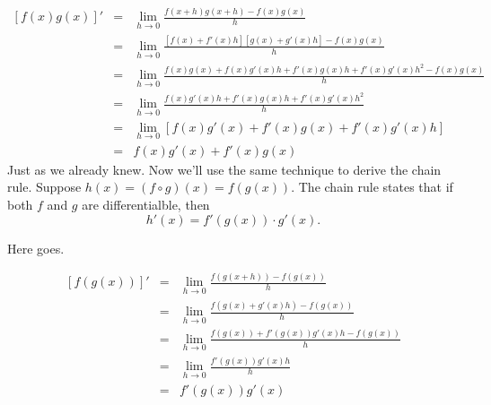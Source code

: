 \documentclass[12pt,addpoints, answers, fleqn]{exam}
\begin{document}
\begin{eqnarray*}
\left[ f \left( x \right)  g \left( x \right) \right]' &=&
\mathop {\lim }\limits_{h \to 0 }  
\frac{f \left( x+h \right)  g \left( x+h \right) - f \left( x \right)  g \left( x \right) }{h}\\
&=&
\mathop {\lim }\limits_{h \to 0 }  
\frac{\left[  f \left( x  \right) + f' \left( x  \right) h \right]  \left[  g \left( x  \right) + g' \left( x  \right) h \right] - f \left( x \right)  g \left( x \right) }{h}\\
&=&
\mathop {\lim }\limits_{h \to 0 }  
\frac{f \left( x \right)  g \left( x \right) + f \left( x  \right)  g' \left( x  \right) h + f' \left( x  \right)      g \left( x  \right)h + f' \left( x  \right)    g' \left( x  \right) h^2  - f \left( x \right)  g \left( x \right) }{h}\\
&=&
\mathop {\lim }\limits_{h \to 0 }  
\frac{f \left( x  \right)  g' \left( x  \right) h + f' \left( x  \right)      g \left( x  \right)h + f' \left( x  \right)    g' \left( x  \right) h^2 }{h}\\
&=&
\mathop {\lim }\limits_{h \to 0 }  
\left[ f \left( x  \right)  g' \left( x  \right)  + f' \left( x  \right)      g \left( x  \right) + f' \left( x  \right)    g' \left( x  \right) h \right]\\
&=&
f \left( x  \right)  g' \left( x  \right)  + f' \left( x  \right)      g \left( x  \right)
\end{eqnarray*}
Just as we already knew. Now we'll use the same technique to derive the chain rule. Suppose $h\left( x \right) = \left( f  \circ g \right) \left( x \right) = f \left( g \left( x \right) \right)$. The chain rule states that if both $f$ and $g$ are differentialble, then
\[
h'\left( x \right) = f' \left( g \left( x \right) \right) \cdot g' \left( x \right).
\]


Here goes.

\begin{eqnarray*}
\left[ f \left( g \left( x \right) \right)   \right]' &=&
\mathop {\lim }\limits_{h \to 0 }  
\frac{f \left( g \left( x + h \right) \right) - f \left( g \left( x \right) \right) }{h}\\
&=&
\mathop {\lim }\limits_{h \to 0 }  
\frac{f \left( g \left( x \right) + g' \left( x \right) h \right) - f \left( g \left( x \right) \right) }{h}\\
&=& \mathop {\lim }\limits_{h \to 0 }  
\frac{f \left( g \left( x \right) \right) + f' \left( g \left( x \right) \right) g' \left( x \right) h  - f \left( g \left( x \right) \right) }{h}\\
&=& \mathop {\lim }\limits_{h \to 0 }  
\frac{f' \left( g \left( x \right) \right) g' \left( x \right) h}{h}\\
&=&
f' \left( g \left( x \right) \right) g' \left( x \right)\\
\end{eqnarray*}
\end{document}
